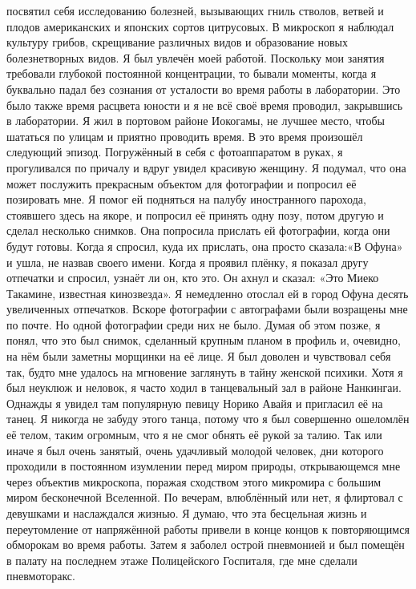 \documentclass[a4paper]{book}
\begin{document}
посвятил себя исследованию болезней, вызывающих гниль стволов, ветвей и плодов
американских и японских сортов цитрусовых.
В микроскоп я наблюдал культуру грибов, скрещивание различных видов и образование
новых болезнетворных видов. Я был увлечён моей работой. Поскольку мои занятия
требовали глубокой постоянной концентрации, то бывали моменты, когда я буквально падал
без сознания от усталости во время работы в лаборатории.
Это было также время расцвета юности и я не всё своё время проводил, закрывшись в
лаборатории. Я жил в портовом районе Иокогамы, не лучшее место, чтобы шататься по
улицам и приятно проводить время.
В это время произошёл следующий эпизод. Погружённый в себя с фотоаппаратом в
руках, я прогуливался по причалу и вдруг увидел красивую женщину. Я подумал, что она
может послужить прекрасным объектом для фотографии и попросил её позировать мне. Я
помог ей подняться на палубу иностранного парохода, стоявшего здесь на якоре, и попросил
её принять одну позу, потом другую и сделал несколько снимков. Она попросила прислать ей
фотографии, когда они будут готовы. Когда я спросил, куда их прислать, она просто
сказала:«В Офуна» и ушла, не назвав своего имени.
Когда я проявил плёнку, я показал другу отпечатки и спросил, узнаёт ли он, кто это. Он
ахнул и сказал: «Это Миеко Такамине, известная кинозвезда». Я немедленно отослал ей в
город Офуна десять увеличенных отпечатков. Вскоре фотографии с автографами были
возращены мне по почте. Но одной фотографии среди них не было. Думая об этом позже, я
понял, что это был снимок, сделанный крупным планом в профиль и, очевидно, на нём были
заметны морщинки на её лице. Я был доволен и чувствовал себя так, будто мне удалось на
мгновение заглянуть в тайну женской психики.
Хотя я был неуклюж и неловок, я часто ходил в танцевальный зал в районе Нанкингаи.
Однажды я увидел там популярную певицу Норико Авайя и пригласил её на танец. Я никогда
не забуду этого танца, потому что я был совершенно ошеломлён её телом, таким огромным,
что я не смог обнять её рукой за талию. Так или иначе я был очень занятый, очень удачливый
молодой человек, дни которого проходили в постоянном изумлении перед миром природы,
открывающемся мне через объектив микроскопа, поражая сходством этого микромира с
большим миром бесконечной Вселенной. По вечерам, влюблённый или нет, я флиртовал с
девушками и наслаждался жизнью. Я думаю, что эта бесцельная жизнь и переутомление от
напряжённой работы привели в конце концов к повторяющимся обморокам во время работы.
Затем я заболел острой пневмонией и был помещён в палату на последнем этаже
Полицейского Госпиталя, где мне сделали пневмоторакс.
\end{document}
